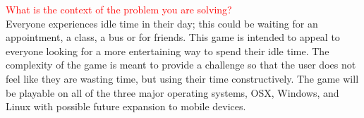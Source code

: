\documentclass[12pt]{article}
\begin{document}
\textcolor{red}{What is the context of the problem you are solving?}\\
Everyone experiences idle time in their day; this could be waiting for an appointment, a class, a bus or for friends. This game is intended to appeal to everyone looking for a more entertaining way to spend their idle time. The complexity of the game is meant to provide a challenge so that the user does not feel like they are wasting time, but using their time constructively.
The game will be playable on all of the three major operating systems, OSX, Windows, and Linux with possible future expansion to mobile devices. \vspace{10mm}
\end{document}
